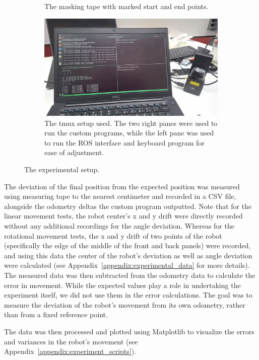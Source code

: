 \documentclass[a4paper, 12pt]{article}
\begin{document}
\begin{figure}[H]
\begin{subfigure}[t]{0.49\linewidth}
            \caption{The masking tape with marked start and end points.}
        \end{subfigure}
        \hfill
        \begin{subfigure}[t]{0.49\linewidth}
            \centering
            \includegraphics[width=\linewidth]{images/sec4/tmux-setup.jpg}
            \caption{The tmux setup used. The two right panes were used to run the custom programs, while the left pane was used to run the ROS interface and keyboard program for ease of adjustment.}
        \end{subfigure}
        \caption{The experimental setup.}
    \end{figure}
    
    The deviation of the final position from the expected position was measured using measuring tape to the nearest centimeter and recorded in a CSV file, alongside the odometry deltas the custom program outputted. Note that for the linear movement tests, the robot center's x and y drift were directly recorded without any additional recordings for the angle deviation. Whereas for the rotational movement tests, the x and y drift of two points of the robot (specifically the edge of the middle of the front and back panels) were recorded, and using this data the center of the robot's deviation as well as angle deviation were calculated (see Appendix~\ref{appendix:experimental_data} for more details). The measured data was then subtracted from the odometry data to calculate the error in movement. While the expected values play a role in undertaking the experiment itself, we did not use them in the error calculations. The goal was to measure the deviation of the robot's movement from its own odometry, rather than from a fixed reference point.
    
    The data was then processed and plotted using Matplotlib to visualize the errors and variances in the robot's movement (see Appendix~\ref{appendix:experiment_scripts}).
\end{document}
